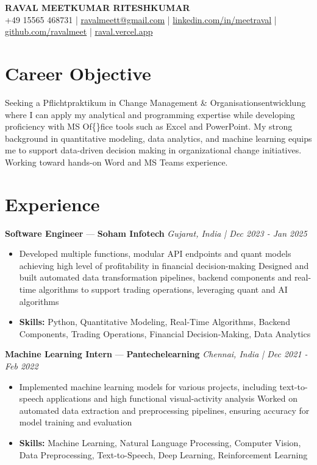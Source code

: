 \documentclass[a4paper,10pt]{article}
\begin{document}
\begin{center}
  {\Large\bfseries RAVAL MEETKUMAR RITESHKUMAR}\\[2pt]
  {\small +49 15565 468731 \;|\; \href{mailto:ravalmeett@gmail.com}{ravalmeett@gmail.com} \;|\; \href{https://www.linkedin.com/in/meetraval/}{linkedin.com/in/meetraval} \;|\; \href{https://github.com/ravalmeet}{github.com/ravalmeet} \;|\; \href{https://raval.vercel.app/}{raval.vercel.app}}
\end{center}
\vspace{-3pt}

\section*{Career Objective}
Seeking a Pflichtpraktikum in Change Management \& Organisationsentwicklung where I can apply my analytical and programming expertise while developing proficiency with MS Of\{\}fice tools such as Excel and PowerPoint. My strong background in quantitative modeling, data analytics, and machine learning equips me to support data-driven decision making in organizational change initiatives. Working toward hands-on Word and MS Teams experience.\par

\section*{Experience}
\textbf{Software Engineer} — \textbf{Soham Infotech} \hfill \textit{Gujarat, India \;|\; Dec 2023 - Jan 2025}\par
\vspace{1pt}
\begin{itemize}
  \item Developed multiple functions, modular API endpoints and quant models achieving high level of profitability in financial decision-making Designed and built automated data transformation pipelines, backend components and real-time algorithms to support trading operations, leveraging quant and AI algorithms
  \item \textbf{Skills:} Python, Quantitative Modeling, Real-Time Algorithms, Backend Components, Trading Operations, Financial Decision-Making, Data Analytics
\end{itemize}
\vspace{3pt}
\textbf{Machine Learning Intern} — \textbf{Pantechelearning} \hfill \textit{Chennai, India \;|\; Dec 2021 - Feb 2022}\par
\vspace{1pt}
\begin{itemize}
  \item Implemented machine learning models for various projects, including text-to-speech applications and high functional visual-activity analysis Worked on automated data extraction and preprocessing pipelines, ensuring accuracy for model training and evaluation
  \item \textbf{Skills:} Machine Learning, Natural Language Processing, Computer Vision, Data Preprocessing, Text-to-Speech, Deep Learning, Reinforcement Learning
\end{itemize}
\end{document}
